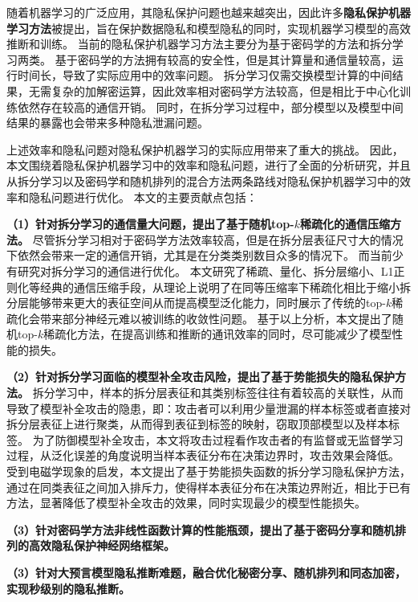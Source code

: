 \cleardoublepage
{}
随着机器学习的广泛应用，其隐私保护问题也越来越突出，因此许多\textbf{隐私保护机器学习方法}被提出，旨在保护数据隐私和模型隐私的同时，实现机器学习模型的高效推断和训练。
%
当前的隐私保护机器学习方法主要分为基于密码学的方法和拆分学习两类。
基于密码学的方法拥有较高的安全性，但是其计算量和通信量较高，运行时间长，导致了实际应用中的效率问题。
拆分学习仅需交换模型计算的中间结果，无需复杂的加解密运算，因此效率相对密码学方法较高，但是相比于中心化训练依然存在较高的通信开销。
同时，在拆分学习过程中，部分模型以及模型中间结果的暴露也会带来多种隐私泄漏问题。
%

上述效率和隐私问题对隐私保护机器学习的实际应用带来了重大的挑战。
%
因此，本文围绕着隐私保护机器学习中的效率和隐私问题，进行了全面的分析研究，并且从拆分学习以及密码学和随机排列的混合方法两条路线对隐私保护机器学习中的效率和隐私问题进行优化。
%
本文的主要贡献点包括：


\textbf{（1）针对拆分学习的通信量大问题，提出了基于随机top-$k$稀疏化的通信压缩方法。}
尽管拆分学习相对于密码学方法效率较高，但是在拆分层表征尺寸大的情况下依然会带来一定的通信开销，尤其是在分类类别数目众多的情况下。
%
而当前少有研究对拆分学习的通信进行优化。
%
本文研究了稀疏、量化、拆分层缩小、L1正则化等经典的通信压缩手段，从理论上说明了在同等压缩率下稀疏化相比于缩小拆分层能够带来更大的表征空间从而提高模型泛化能力，同时展示了传统的top-$k$稀疏化会带来部分神经元难以被训练的收敛性问题。
%
基于以上分析，本文提出了随机top-$k$稀疏化方法，在提高训练和推断的通讯效率的同时，尽可能减少了模型性能的损失。

\textbf{（2）针对拆分学习面临的模型补全攻击风险，提出了基于势能损失的隐私保护方法。}
拆分学习中，样本的拆分层表征和其类别标签往往有着较高的关联性，从而导致了模型补全攻击的隐患，即：攻击者可以利用少量泄漏的样本标签或者直接对拆分层表征上进行聚类，从而得到表征到标签的映射，窃取顶部模型以及样本标签。
%
为了防御模型补全攻击，本文将攻击过程看作攻击者的有监督或无监督学习过程，从泛化误差的角度说明当样本表征分布在决策边界时，攻击效果会降低。
%
受到电磁学现象的启发，本文提出了基于势能损失函数的拆分学习隐私保护方法，通过在同类表征之间加入排斥力，使得样本表征分布在决策边界附近，相比于已有方法，显著降低了模型补全攻击的效果，同时实现最少的模型性能损失。
%

\textbf{（3）针对密码学方法非线性函数计算的性能瓶颈，提出了基于密码分享和随机排列的高效隐私保护神经网络框架。}


\textbf{（3）针对大预言模型隐私推断难题，融合优化秘密分享、随机排列和同态加密，实现秒级别的隐私推断。}



\cleardoublepage
{}
